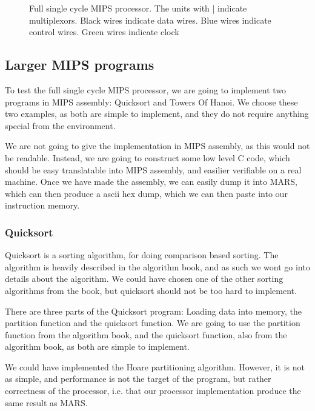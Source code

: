 \begin{figure}
{
    }
    \caption{Full single cycle MIPS processor. The units with | indicate
    multiplexors. Black wires indicate data wires. Blue wires indicate control
    wires. Green wires indicate clock}
    \label{fig:single-proc-full}
\end{figure}
\subsection{Larger MIPS programs}
To test the full single cycle MIPS processor, we are going to implement two
programs in MIPS assembly: Quicksort and Towers Of Hanoi. We choose these two
examples, as both are simple to implement, and they do not require anything
special from the environment.

We are not going to give the implementation in MIPS assembly, as this would not
be readable. Instead, we are going to construct some low level C code,
which should be easy translatable into MIPS assembly, and easilier verifiable
on a real machine. Once we have made the assembly, we can easily dump it into
MARS, which can then produce a ascii hex dump, which we can then paste into our
instruction memory.

\subsubsection*{Quicksort}
Quicksort is a sorting algorithm, for doing comparison based sorting. The
algorithm is heavily described in the algorithm book\cite{ref:alg}, and as such
we wont go into details about the algorithm. We could have chosen one of the
other sorting algorithms from the book, but quicksort should not be too hard to
implement.

There are three parts of the Quicksort program: Loading data into memory, the
partition function and the quicksort function. We are going to use the
partition function from the algorithm book, and the quicksort function, also
from the algorithm book, as both are simple to implement.

We could have implemented the Hoare partitioning algorithm. However, it is not
as simple, and performance is not the target of the program, but rather
correctness of the processor, i.e.  that our processor implementation produce
the same result as MARS.

